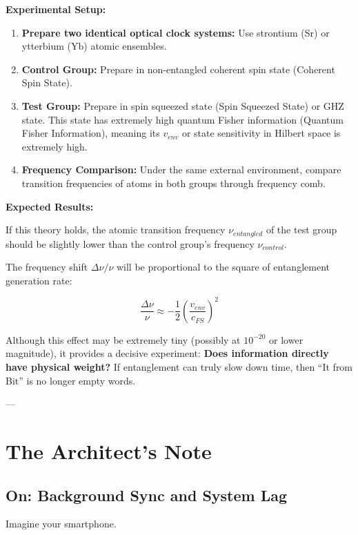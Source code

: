 \documentclass[11pt,a4paper,twoside]{book}
\begin{document}
\textbf{Experimental Setup:}

\begin{enumerate}
\item \textbf{Prepare two identical optical clock systems:} Use strontium (Sr) or ytterbium (Yb) atomic ensembles.

\item \textbf{Control Group:} Prepare in non-entangled coherent spin state (Coherent Spin State).

\item \textbf{Test Group:} Prepare in spin squeezed state (Spin Squeezed State) or GHZ state. This state has extremely high quantum Fisher information (Quantum Fisher Information), meaning its \textbf{$v_{env}$} or state sensitivity in Hilbert space is extremely high.

\item \textbf{Frequency Comparison:} Under the same external environment, compare transition frequencies of atoms in both groups through frequency comb.
\end{enumerate}

\textbf{Expected Results:}

If this theory holds, the atomic transition frequency \textbf{$\nu_{entangled}$} of the test group should be slightly lower than the control group's frequency \textbf{$\nu_{control}$}.

The frequency shift \textbf{$\Delta \nu / \nu$} will be proportional to the square of entanglement generation rate:

$$\frac{\Delta \nu}{\nu} \approx -\frac{1}{2} \left( \frac{v_{env}}{c_{FS}} \right)^2$$

Although this effect may be extremely tiny (possibly at \textbf{$10^{-20}$} or lower magnitude), it provides a decisive experiment: \textbf{Does information directly have physical weight?} If entanglement can truly slow down time, then ``It from Bit'' is no longer empty words.

---

\section{The Architect's Note}

\subsection{On: Background Sync and System Lag}

Imagine your smartphone.
\end{document}
